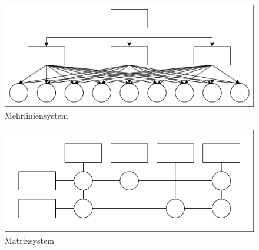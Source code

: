 \begin{figure}[H]
    \centering
    \includegraphics[width=\textwidth]{figures/mehrliniensystem.png}
    \caption{Mehrliniensystem}
    \label{fig:mehrliniensystem}
\end{figure}
\FloatBarrier

\begin{figure}[H]
    \centering
    \includegraphics[width=\textwidth]{figures/matrixsystem.png}
    \caption{Matrixsystem}
    \label{fig:matrixsystem}
\end{figure}
\FloatBarrier
